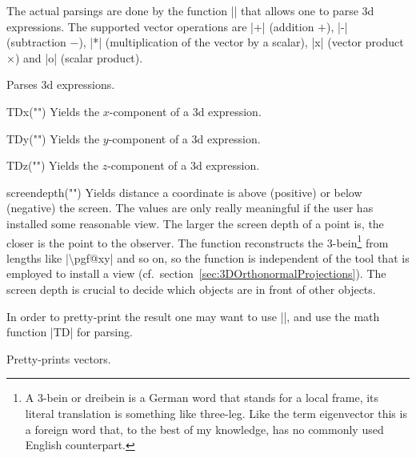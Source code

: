\documentclass[a4paper,fleqn]{ltxdoc}
\begin{document}
The actual parsings are done by the function |\pgfmathtdparse| that allows one
to parse 3d expressions. The supported vector operations are |+| (addition $+$),
|-| (subtraction $-$), |*| (multiplication of the vector by a scalar), |x|
(vector product $\times$) and |o| (scalar product).

\begin{command}{}
   Parses 3d expressions.
\end{command}

\begin{math-function}{TDx("")}
   Yields the $x$-component of a 3d expression.
\end{math-function}

\begin{math-function}{TDy("")}
   Yields the $y$-component of a 3d expression.
\end{math-function}

\begin{math-function}{TDz("")}
   Yields the $z$-component of a 3d expression.
\end{math-function}


\begin{math-function}{screendepth("")}
   Yields distance a coordinate is above (positive) or below (negative) the
   screen. The values are only really meaningful if the user has installed some
   reasonable view. The larger the screen depth of a point is, the closer is the
   point to the observer. The function reconstructs the 3-bein\footnote{A 3-bein
   or dreibein is a German word that stands for a local frame, its literal
   translation is something like three-leg. Like the term eigenvector this is a
   foreign word that, to the best of my knowledge, has no commonly used English
   counterpart.} from lengths like  |\textbackslash pgf@xy| and so on, so the
   function is independent of the tool that is employed to install a view (cf.\
   section~\ref{sec:3DOrthonormalProjections}). The screen depth is crucial to
   decide which objects are in front of other objects. 
\end{math-function}

In order to pretty-print the result one may want to use |\pgfmathprintvector|,
and use the math function |TD| for parsing.

\begin{command}{\pgfmathprintvector{}}
   Pretty-prints vectors.
\end{command}
\end{document}
